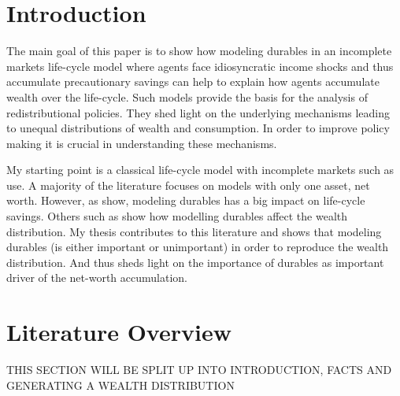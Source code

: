 \documentclass[a4paper,12pt]{article}
\begin{document}


\setcounter{page}{1}        %


\section{Introduction}
\label{Chapter1}

The main goal of this paper is to show how modeling durables in an incomplete markets life-cycle model where agents face idiosyncratic income shocks and thus accumulate precautionary savings can help to explain how agents accumulate wealth over the life-cycle. Such models provide the basis for the analysis of redistributional policies. They shed light on the underlying mechanisms leading to unequal distributions of wealth and consumption. In order to improve policy making it is crucial in understanding these mechanisms. 

My starting point is a classical life-cycle model with incomplete markets such as \cite{hintermaier2011} use. A majority of the literature focuses on models with only one asset, net worth. However, as \cite{FV&K2011} show, modeling durables has a big impact on life-cycle savings. Others such as \cite{diaz2010} show how modelling durables affect the wealth distribution. My thesis contributes to this literature and shows that modeling durables (is either important or unimportant) in order to reproduce the wealth distribution. And thus sheds light on the importance of durables as important driver of the net-worth accumulation. 

\section{Literature Overview}
\label{Chapter2}

THIS SECTION WILL BE SPLIT UP INTO INTRODUCTION, FACTS AND GENERATING A WEALTH DISTRIBUTION
\end{document}
